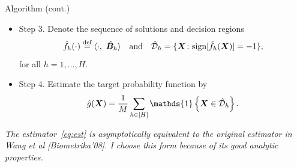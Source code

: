 \documentclass[compress,dvipsnames]{beamer}
\let\olditem\item
\renewcommand\item{\olditem\justifying}
\begin{document}
\begin{frame}{Algorithm (cont.)}
\begin{itemize}
\item Step 3. Denote the sequence of solutions and decision regions
\[
\hat f_h (\cdot)\stackrel{\text{def}}{=}\langle \cdot,\ \hat {\bm{B}}_h \rangle \quad \text{and}\quad \hat {{\mathcal D}}_h=\{\bm{X}\colon\text{sign}[\hat f_h(\bm{X})] = -1 \},
\]
for all $h=1,\ldots,H$.
\item Step 4. Estimate the target probability function by
\begin{align}\label{eq:est}
\hat g(\mX)={1\over M} \sum_{h\in[H]} \mathds{1}\left\{\mX\in \hat \tD_h \right\}.
\end{align}

\end{itemize}
{\scriptsize \it The estimator~\eqref{eq:est} is asymptotically equivalent to the original estimator in Wang et al [Biometrika'08]. I choose this form because of its good analytic properties.}

\end{frame}
\end{document}
